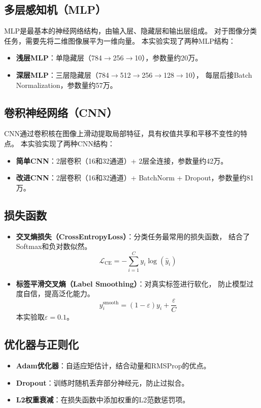 \documentclass[12pt,a4paper]{article}
\begin{document}
\subsection{多层感知机（MLP）}
MLP是最基本的神经网络结构，由输入层、隐藏层和输出层组成。
对于图像分类任务，需要先将二维图像展平为一维向量。
本实验实现了两种MLP结构：
\begin{itemize}
    \item \textbf{浅层MLP}：单隐藏层（784$\rightarrow$256$\rightarrow$10），参数量约20万。
    \item \textbf{深层MLP}：三层隐藏层（784$\rightarrow$512$\rightarrow$256$\rightarrow$128$\rightarrow$10），
          每层后接Batch Normalization，参数量约57万。
\end{itemize}

\subsection{卷积神经网络（CNN）}
CNN通过卷积核在图像上滑动提取局部特征，具有权值共享和平移不变性的特点。
本实验实现了两种CNN结构：
\begin{itemize}
    \item \textbf{简单CNN}：2层卷积（16和32通道）+ 2层全连接，参数量约42万。
    \item \textbf{改进CNN}：2层卷积（16和32通道）+ BatchNorm + Dropout，参数量约81万。
\end{itemize}

\subsection{损失函数}
\begin{itemize}
    \item \textbf{交叉熵损失（CrossEntropyLoss）}：分类任务最常用的损失函数，
          结合了Softmax和负对数似然。
          \[
          \mathcal{L}_{\text{CE}} = -\sum_{i=1}^{C} y_i \log(\hat{y}_i)
          \]
    \item \textbf{标签平滑交叉熵（Label Smoothing）}：对真实标签进行软化，
          防止模型过度自信，提高泛化能力。
          \[
          y_i^{\text{smooth}} = (1-\varepsilon)y_i + \frac{\varepsilon}{C}
          \]
          本实验取$\varepsilon=0.1$。
\end{itemize}

\subsection{优化器与正则化}
\begin{itemize}
    \item \textbf{Adam优化器}：自适应矩估计，结合动量和RMSProp的优点。
    \item \textbf{Dropout}：训练时随机丢弃部分神经元，防止过拟合。
    \item \textbf{L2权重衰减}：在损失函数中添加权重的L2范数惩罚项。
\end{itemize}
\end{document}
